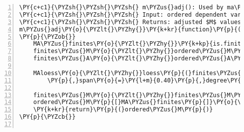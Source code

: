 \begin{Verbatim}[commandchars=\\\{\},codes={\catcode`\$=3\catcode`\^=7\catcode`\_=8},gobble=0,numbers=left,fontfamily=fvm,fontshape=n,fontsize=\footnotesize,tabsize=2]
\PY{c+c1}{\PYZsh{}\PYZsh{}\PYZsh{} m\PYZus{}adj(): Used by ma\PYZus{}adj(), performs LOESS regression on ordered MA\PYZhy{}vals}
\PY{c+c1}{\PYZsh{}\PYZsh{}\PYZsh{} Input: ordered dependent variable $A$ with corresponding $M$}
\PY{c+c1}{\PYZsh{}\PYZsh{}\PYZsh{} Returns: adjusted $M$ values, $M_t^*$}
m\PYZus{}adj\PY{o}{\PYZlt{}\PYZhy{}}\PY{k+kr}{function}\PY{p}{(}ordered\PYZus{}M\PY{p}{,}ordered\PYZus{}A\PY{p}{)}
\PY{p}{\PYZob{}}
	MA\PYZus{}finites\PY{o}{\PYZlt{}\PYZhy{}}\PY{k+kp}{is.finite}\PY{p}{(}ordered\PYZus{}M\PY{p}{)} \PY{c+c1}{\PYZsh{}only include values $>-\infty$}
	finites\PYZus{}M\PY{o}{\PYZlt{}\PYZhy{}}ordered\PYZus{}M\PY{p}{[}MA\PYZus{}finites\PY{p}{]}
	finites\PYZus{}A\PY{o}{\PYZlt{}\PYZhy{}}ordered\PYZus{}A\PY{p}{[}MA\PYZus{}finites\PY{p}{]}
	
	MAloess\PY{o}{\PYZlt{}\PYZhy{}}loess\PY{p}{(}finites\PYZus{}M\PY{o}{\PYZti{}}finites\PYZus{}A
		\PY{p}{,}span\PY{o}{=}\PY{l+m}{0.40}\PY{p}{,}degree\PY{o}{=}\PY{l+m}{2}\PY{p}{,}family\PY{o}{=}\PY{l+s}{\PYZdq{}}\PY{l+s}{symmetric\PYZdq{}}\PY{p}{,}normalize\PY{o}{=}\PY{k+kc}{FALSE}\PY{p}{)}

	finites\PYZus{}M\PY{o}{\PYZlt{}\PYZhy{}}finites\PYZus{}M\PY{o}{\PYZhy{}}MAloess\PY{o}{\PYZdl{}}fitted \PY{c+c1}{\PYZsh{} make adjustments }
	ordered\PYZus{}M\PY{p}{[}MA\PYZus{}finites\PY{p}{]}\PY{o}{\PYZlt{}\PYZhy{}}finites\PYZus{}M \PY{c+c1}{\PYZsh{} and return adjusted values}
	\PY{k+kr}{return}\PY{p}{(}ordered\PYZus{}M\PY{p}{)}
\PY{p}{\PYZcb{}}


\end{Verbatim}
